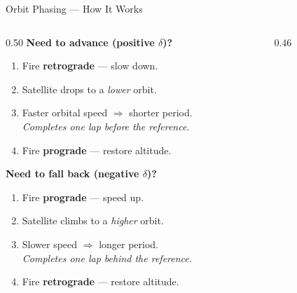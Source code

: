 \documentclass[aspectratio=169, 10pt]{beamer}
\newcommand{\du}{\delta}
\begin{document}
\begin{frame}{Orbit Phasing --- How It Works}
  \begin{columns}[T]
    \begin{column}{0.50\textwidth}
      \textbf{Need to advance (positive $\du$)?}
      \begin{enumerate}[<+->]
        \item Fire \textbf{retrograde} --- slow down.
        \item Satellite drops to a \emph{lower} orbit.
        \item Faster orbital speed $\Rightarrow$ shorter period.\\
              \textit{Completes one lap before the reference.}
        \item Fire \textbf{prograde} --- restore altitude.
      \end{enumerate}
      \pause\medskip
      \textbf{Need to fall back (negative $\du$)?}
      \begin{enumerate}[<+->]
        \item Fire \textbf{prograde} --- speed up.
        \item Satellite climbs to a \emph{higher} orbit.
        \item Slower speed $\Rightarrow$ longer period.\\
              \textit{Completes one lap behind the reference.}
        \item Fire \textbf{retrograde} --- restore altitude.
      \end{enumerate}
    \end{column}
    \begin{column}{0.46\textwidth}
    \end{column}
  \end{columns}
\end{frame}
\end{document}

